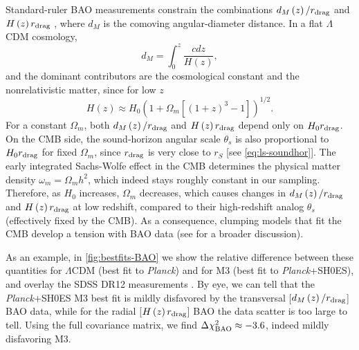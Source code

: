 Standard-ruler BAO measurements constrain the combinations $d_M\left(z\right)/r_{\rm drag}$ and $H\left(z\right)r_{\rm drag}$ \citep{BOSS-DR12}, where $d_M$ is the comoving angular-diameter distance.
In a flat $\Lambda$CDM cosmology,
\begin{equation}
    d_M = \int_0^z \frac{cdz}{H\left(z\right)},
\end{equation}
and the dominant contributors are the cosmological constant and the nonrelativistic matter, since for low $z$
$$ H\left(z\right)\approx H_0\left(1+\Omega_m\left[\left(1+z\right)^3-1\right]\right)^{1/2}. $$
For a constant $\Omega_m$, both $d_M\left(z\right)/r_{\rm drag}$ and $H\left(z\right)r_{\rm drag}$ depend only on $H_0r_{\rm drag}$.
On the CMB side, the sound-horizon angular scale $\theta_s$ is also proportional to $H_0r_{\rm drag}$ for fixed $\Omega_m$, since $r_{\rm drag}$ is very close to $r_S$ [see \cref{eq:ls-soundhor}].
The early integrated Sachs-Wolfe effect in the CMB determines the physical matter density $\omega_m=\Omega_mh^2$, which indeed stays roughly constant in our sampling.
Therefore, as $H_0$ increases, $\Omega_m$ decreases, which causes changes in $d_M\left(z\right)/r_{\rm drag}$ and $H\left(z\right)r_{\rm drag}$ at low redshift, compared to their high-redshift analog $\theta_s$ (effectively fixed by the CMB).
As a consequence, clumping models that fit the CMB develop a tension with BAO data (see \citet{sound-horizon-not-enough} for a broader discussion).

As an example, in \cref{fig:bestfits-BAO} we show the relative difference between these quantities for $\Lambda$CDM (best fit to {\it Planck}) and for M3 (best fit to {\it Planck}+SH0ES), and overlay the SDSS DR12 measurements \citep{BOSS-DR12}.
By eye, we can tell that the {\it Planck}+SH0ES M3 best fit is mildly disfavored by the transversal [$d_M\left(z\right)/r_{\rm drag}$] BAO data, while for the radial [$H\left(z\right)r_{\rm drag}$] BAO the data scatter is too large to tell.
Using the full covariance matrix, we find $\Delta\chi^2_{\rm BAO}\approx-3.6$, indeed mildly disfavoring M3.

